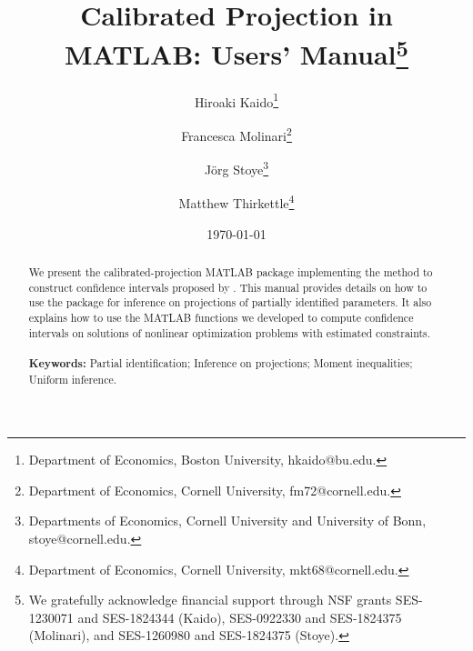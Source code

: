\documentclass[12pt]{article}
\begin{document}
\begin{titlepage}
\title{Calibrated Projection in MATLAB: Users' Manual\thanks{We gratefully acknowledge financial support through NSF grants SES-1230071 and SES-1824344 (Kaido), SES-0922330 and SES-1824375 (Molinari), and SES-1260980 and SES-1824375 (Stoye).}}
\author{\normalsize{Hiroaki Kaido}\thanks{Department of Economics, Boston University, hkaido@bu.edu.} \and
            \normalsize{Francesca Molinari}\thanks{Department of Economics, Cornell University, fm72@cornell.edu.} \and
            \normalsize{J\"org Stoye}\thanks{ Departments of Economics, Cornell University and University of Bonn, stoye@cornell.edu.} \and
            \normalsize{Matthew Thirkettle}\thanks{Department of Economics, Cornell University, mkt68@cornell.edu.}}
\date{\normalsize{\today}}
\maketitle
\begin{abstract}
\noindent We present the calibrated-projection MATLAB package implementing the method to construct confidence intervals proposed by .  This manual provides details on how to use the package for inference on projections of partially identified parameters.  It also explains how to use the MATLAB functions we developed to compute confidence intervals on solutions of nonlinear optimization problems with estimated constraints. \\
\vspace{0in}\\
\noindent\textbf{Keywords:}  Partial identification; Inference on projections; Moment inequalities; Uniform inference.\\
\bigskip
\end{abstract}
\setcounter{page}{0}
\thispagestyle{empty}
\end{titlepage}
\pagebreak \newpage




\doublespacing
\end{document}
